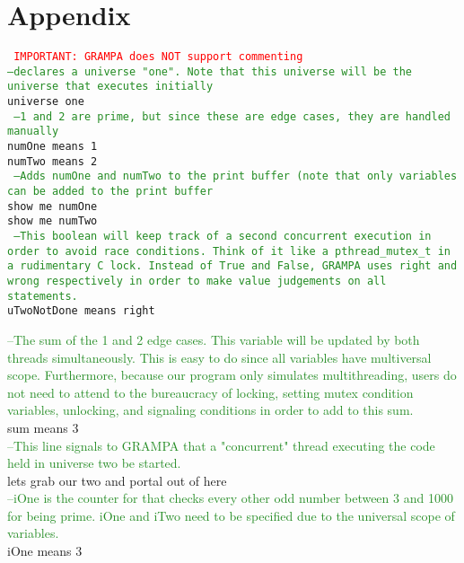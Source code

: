 \documentclass[preprint]{sigplanconf}
\begin{document}
\section{Appendix}
{\tt
\textcolor{red}{IMPORTANT: GRAMPA does NOT support commenting}\\
\textcolor{ForestGreen}{--declares a universe "one". Note that this universe will be the universe that executes initially}\\ universe one \\

\textcolor{ForestGreen}{  --1 and 2 are prime, but since these are edge cases, they are handled manually}\\
\indent numOne means 1\\
\indent numTwo means 2\\

\textcolor{ForestGreen}{  --Adds numOne and numTwo to the print buffer (note that only variables can be added to the print buffer}\\
\indent show me numOne\\
\indent show me numTwo\\

\textcolor{ForestGreen}{  --This boolean will keep track of a second concurrent execution in order to avoid race conditions. Think of it like a pthread\_mutex\_t in a rudimentary C lock. Instead of True and False, GRAMPA uses right and wrong respectively in order to make value judgements on all statements.}\\
\indent uTwoNotDone means right

\textcolor{ForestGreen}{  --The sum of the 1 and 2 edge cases. This variable will be updated by both threads simultaneously. This is easy to do since all variables have multiversal scope. Furthermore, because our program only simulates multithreading, users do not need to attend to the bureaucracy of locking, setting mutex condition variables, unlocking, and signaling conditions in order to add to this sum.}\\
\indent sum means 3\\

\textcolor{ForestGreen}{  --This line signals to GRAMPA that a "concurrent" thread executing the code held in universe two be started.} \\
\indent lets grab our two and portal out of here \\

\textcolor{ForestGreen}{  --iOne is the counter for that checks every other odd number between 3 and 1000 for being prime. iOne and iTwo need to be specified due to the universal scope of variables.} \\
\indent iOne means 3 \\

}
\end{document}
